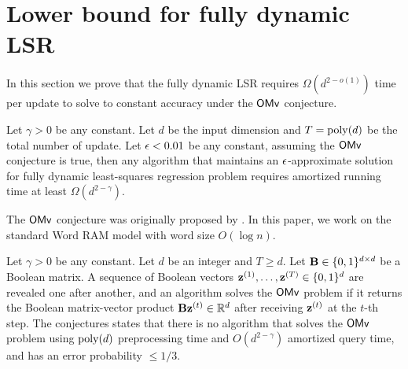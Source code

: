 \section{Lower bound for fully dynamic LSR}
\label{sec:fully}
In this section we prove that the fully dynamic LSR requires $\Omega(d^{2-o(1)})$ time per update to solve to constant accuracy under the $\mathsf{OMv}$ conjecture.


\begin{theorem}
\label{thm:lower-full}
Let $\gamma > 0$ be any constant. Let $d$ be the input dimension and $T = \operatorname{poly}(d)$ be the total number of update. Let $\epsilon < 0.01$ be any constant, assuming the $\mathsf{OMv}$ conjecture is true, then any algorithm that maintains an $\epsilon$-approximate solution for fully dynamic least-squares regression problem requires amortized running time at least $\Omega(d^{2 -\gamma})$.
\end{theorem}



The $\mathsf{OMv}$ conjecture was originally proposed by \cite{hkns}. In this paper, we work on the standard Word RAM model with word size $O(\log n)$.
\begin{conjecture}
\label{conj:omv}
Let $\gamma > 0$ be any constant. Let $d$ be an integer and $T \geq d$. 
Let $\mathbf{B}\in \{0,1\}^{d \times d}$ be a Boolean matrix. A sequence of Boolean vectors $\mathbf{z}^{(1)}, \ldots, \mathbf{z}^{(T)} \in \{0,1\}^d$ are revealed one after another, and an algorithm solves the $\mathsf{OMv}$ problem if it returns the Boolean matrix-vector product $\mathbf{B} \mathbf{z}^{(t)} \in \mathbb{R}^d$ after receiving $\mathbf{z}^{(t)}$ at the $t$-th step.
The conjectures states that there is no algorithm that solves the $\mathsf{OMv}$ problem using $\operatorname{poly}(d)$ preprocessing time and $O(d^{2-\gamma})$ amortized query time, and has an error probability $\leq 1/3$.
\end{conjecture}





